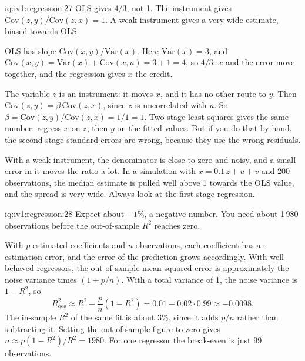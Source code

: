 \begin{solution}{iq:iv1:regression:27}
OLS gives $4/3$, not 1. The instrument gives $\mathrm{Cov}(z, y)/\mathrm{Cov}(z, x) = 1$. A weak instrument gives a very wide estimate, biased towards OLS.

OLS has slope $\mathrm{Cov}(x, y)/\mathrm{Var}(x)$. Here $\mathrm{Var}(x) = 3$, and $\mathrm{Cov}(x, y) = \mathrm{Var}(x) + \mathrm{Cov}(x, u) = 3 + 1 = 4$, so $4/3$: $x$ and the error move together, and the regression gives $x$ the credit.

The variable $z$ is an instrument: it moves $x$, and it has no other route to $y$. Then $\mathrm{Cov}(z, y) = \beta\,\mathrm{Cov}(z, x)$, since $z$ is uncorrelated with $u$. So $\beta = \mathrm{Cov}(z, y)/\mathrm{Cov}(z, x) = 1/1 = 1$. Two-stage least squares gives the same number: regress $x$ on $z$, then $y$ on the fitted values. But if you do that by hand, the second-stage standard errors are wrong, because they use the wrong residuals.

With a weak instrument, the denominator is close to zero and noisy, and a small error in it moves the ratio a lot. In a simulation with $x = 0.1\,z + u + v$ and 200 observations, the median estimate is pulled well above 1 towards the OLS value, and the spread is very wide. Always look at the first-stage regression.

\end{solution}

\begin{solution}{iq:iv1:regression:28}
Expect about $-1\%$, a negative number. You need about 1\,980 observations before the out-of-sample $R^2$ reaches zero.

With $p$ estimated coefficients and $n$ observations, each coefficient has an estimation error, and the error of the prediction grows accordingly. With well-behaved regressors, the out-of-sample mean squared error is approximately the noise variance times $(1 + p/n)$. With a total variance of 1, the noise variance is $1 - R^2$, so
\[
R^2_{\text{oos}} \approx R^2 - \frac{p}{n}(1 - R^2) = 0.01 - 0.02 \cdot 0.99 \approx -0.0098 .
\]
The in-sample $R^2$ of the same fit is about 3\%, since it adds $p/n$ rather than subtracting it. Setting the out-of-sample figure to zero gives $n \approx p(1 - R^2)/R^2 = 1980$. For one regressor the break-even is just 99 observations.

\end{solution}


